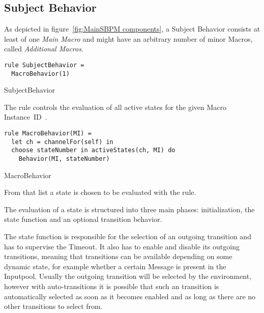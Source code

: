 \subsection{Subject Behavior}


As depicted in figure~\ref{fig:MainSBPM components}, a Subject Behavior consists at least of one \textit{Main Macro}
and might have an arbitrary number of minor Macros, called \textit{Additional Macros}.

\begin{listing}[H]
\begin{verbatim}
rule SubjectBehavior =
  MacroBehavior(1)
\end{verbatim}
\caption{SubjectBehavior}
\label{lst:shortasm:SubjectBehavior}
\end{listing}




The  rule controls the evaluation of all active
states for the given Macro Instance~ID~.


\begin{listing}[H]
\begin{verbatim}
rule MacroBehavior(MI) =
  let ch = channelFor(self) in
  choose stateNumber in activeStates(ch, MI) do
    Behavior(MI, stateNumber)
\end{verbatim}
\caption{MacroBehavior}
\label{lst:shortasm:MacroBehavior}
\end{listing}

From that list a state  is chosen to be evaluated with the  rule.



The evaluation of a state is structured into three main phases: initialization,
the state function and an optional transition behavior.

The state function is responsible for the selection of an outgoing transition and
has to supervise the Timeout. It also has to enable and disable its outgoing
transitions, meaning that transitions can be available depending on some dynamic state,
for example whether a certain Message is present in the Inputpool.
Usually the outgoing transition will be selected by the environment, however with
auto-transitions it is possible that such an transition is automatically selected as soon
as it becomes enabled and as long as there are no other transitions to select from.


